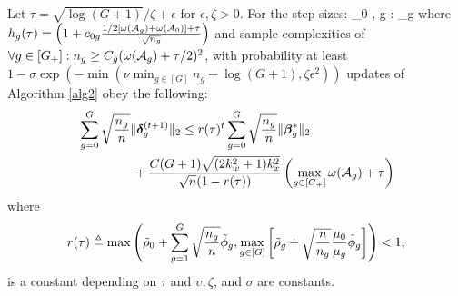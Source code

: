 \begin{theorem}
	\label{theo:step}		
	Let $\tau = \sqrt{\log(G+1)}/\zeta + \epsilon$ for $\epsilon, \zeta > 0$. For the step sizes:
	\be
	\nr
	\mu_0 \leq {} ,
	\forall g \in [G]: \mu_g \leq  {} 
	\ee
	where $h_g(\tau) = \left(1 + c_{0g} \frac{1/2[\omega(\cA_g) + \omega(\cA_0)] + \tau}{\sqrt{n_g}}\right)$
	and sample complexities of $\forall g \in [G_+]: n_g \geq C_g (\omega(\cA_g) + \tau/2)^2$,
	with probability at least $ 1 - \sigma \exp(- \min(\nu \min_{g \in [G]} n_g - \log(G+1), \zeta \epsilon^2) )$ updates of Algorithm \ref{alg2} obey the following:	
	\begin{align}
	\nr
	&\sum_{g=0}^{G} \sqrt{\frac{n_g}{n}} \norm{\ddelta_g^{(t+1)}}{2}
	\leq r(\tau)^t \sum_{g=0}^{G} \sqrt{\frac{n_g}{n}} \norm{\bbeta^*_g}{2}   
	\\ \nr 
	&\hspace*{1.5cm}+ \frac{C(G+1)\sqrt{(2k_w^2 + 1)k_x^2}}{\sqrt{n}(1 - r(\tau))} \left(\max_{g \in [G_+]} \omega(\cA_g) + \tau \right)
	\end{align}
	where 
	{\small$$r(\tau) \triangleq \max\left(\tilde{\rho}_0 + \sum_{g=1}^{G} \sqrt{\frac{n_g}{n}} \tilde{\phi}_g, \max_{g \in [G]} \left[\tilde{\rho}_g + \sqrt{\frac{n}{n_g}}  \frac{\mu_0}{\mu_g} \tilde{\phi}_g \right]  \right) < 1,$$} is a constant depending on $\tau$ and $\upsilon, \zeta$, and $\sigma$ are constants.
	
\end{theorem}

